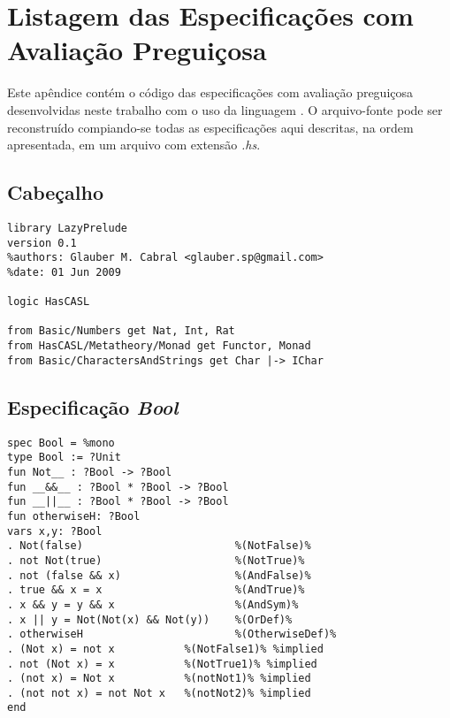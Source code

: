 \chapter{Listagem das Especificações com Avaliação Preguiçosa}
\label{appendix:lazySpec}
Este apêndice contém o código das especificações com avaliação preguiçosa desenvolvidas neste trabalho com o uso da linguagem \HasCASL.
O arquivo-fonte pode ser reconstruído compiando-se todas as especificações aqui descritas, na ordem apresentada, em um arquivo com extensão \textit{.hs}.

\section{Cabeçalho}
\label{appendix:lazySpec:header}
\begin{Verbatim}
library LazyPrelude
version 0.1
%authors: Glauber M. Cabral <glauber.sp@gmail.com>
%date: 01 Jun 2009

logic HasCASL 

from Basic/Numbers get Nat, Int, Rat
from HasCASL/Metatheory/Monad get Functor, Monad
from Basic/CharactersAndStrings get Char |-> IChar
\end{Verbatim}

\section{Especificação \textit{Bool}}
\label{appendix:lazySpec:bool}
\begin{Verbatim}
spec Bool = %mono
type Bool := ?Unit 
fun Not__ : ?Bool -> ?Bool
fun __&&__ : ?Bool * ?Bool -> ?Bool
fun __||__ : ?Bool * ?Bool -> ?Bool
fun otherwiseH: ?Bool      
vars x,y: ?Bool
. Not(false)                        %(NotFalse)%
. not Not(true)                     %(NotTrue)%
. not (false && x)                  %(AndFalse)%
. true && x = x                     %(AndTrue)%
. x && y = y && x                   %(AndSym)%
. x || y = Not(Not(x) && Not(y))    %(OrDef)%
. otherwiseH                        %(OtherwiseDef)%
. (Not x) = not x           %(NotFalse1)% %implied
. not (Not x) = x           %(NotTrue1)% %implied
. (not x) = Not x           %(notNot1)% %implied
. (not not x) = not Not x   %(notNot2)% %implied
end
\end{Verbatim}

